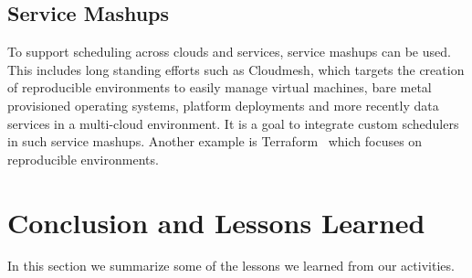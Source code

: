 \documentclass[final,5p,times,twocolumn]{elsarticle}
\begin{document}
\subsection{Service Mashups} 
\label{sec:mesh}

To support scheduling across clouds and services, service mashups can
be used. This includes long standing efforts such as Cloudmesh, which
targets the creation of reproducible environments to easily manage
virtual machines, bare metal provisioned operating systems, platform
deployments and more recently data services in a multi-cloud
environment. It is a goal to integrate custom schedulers in such
service mashups. Another example is Terraform~\cite{www-terraform}
which focuses on reproducible environments.






\section{Conclusion and Lessons Learned}\label{sec:conclusion}



In this section we summarize some of the lessons we learned from our activities.
\end{document}
